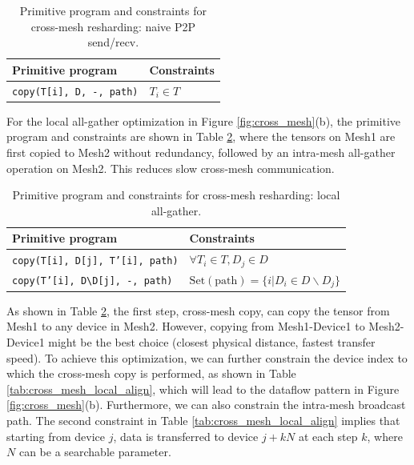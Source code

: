 \begin{table}[h]
\centering
\footnotesize
\begin{tabular}{l|l}
\textbf{Primitive program} & \textbf{Constraints} \\
\hline
\texttt{copy(T[i], D, -, path)} & $T_i \in T$ \\
\hline
\end{tabular}
\caption{Primitive program and constraints for cross-mesh resharding: naive P2P send/recv.}
\label{tab:cross_mesh_p2p}
\end{table}

For the local all-gather optimization in Figure \ref{fig:cross_mesh}(b), the primitive program and constraints are shown in Table \ref{tab:cross_mesh_local}, where the tensors on Mesh1 are first copied to Mesh2 without redundancy, followed by an intra-mesh all-gather operation on Mesh2. This reduces slow cross-mesh communication.

\begin{table}[h]
\centering
\footnotesize
\begin{tabular}{l|l}
\textbf{Primitive program} & \textbf{Constraints} \\
\hline
\texttt{copy(T[i], D[j], T'[i], path)} & $\forall T_i \in T, D_j \in D$ \\
\hline
\texttt{copy(T'[i], D\textbackslash D[j], -, path)} & $\mathrm{Set}(\mathrm{path}) = \{i|D_i \in D\backslash D_j\}$ \\
\hline
\end{tabular}
\caption{Primitive program and constraints for cross-mesh resharding: local all-gather.}
\label{tab:cross_mesh_local}
\end{table}

As shown in Table \ref{tab:cross_mesh_local}, the first step, cross-mesh copy, can copy the tensor from Mesh1 to any device in Mesh2. However, copying from Mesh1-Device1 to Mesh2-Device1 might be the best choice (closest physical distance, fastest transfer speed). To achieve this optimization, we can further constrain the device index to which the cross-mesh copy is performed, as shown in Table \ref{tab:cross_mesh_local_align}, which will lead to the dataflow pattern in Figure \ref{fig:cross_mesh}(b). Furthermore, we can also constrain the intra-mesh broadcast path. The second constraint in Table \ref{tab:cross_mesh_local_align} implies that starting from device $j$, data is transferred to device $j + kN$ at each step $k$, where $N$ can be a searchable parameter.


